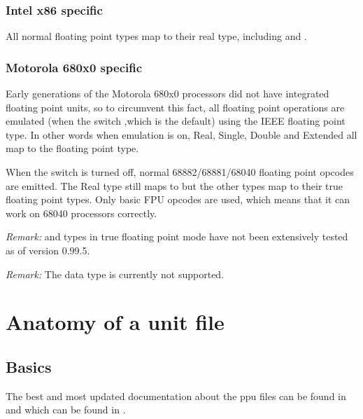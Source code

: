 \documentclass{report}
\begin{document}
\subsection{ Intel x86 specific }

All normal floating point types map to their real type, including
 and .

\subsection{ Motorola 680x0 specific }

Early generations of the Motorola 680x0 processors did not have integrated
floating point units, so to circumvent this fact, all floating point
operations are emulated (when the  switch ,which is the default)
using the IEEE  floating point type. In other words when
emulation is on, Real, Single, Double and Extended all map to the
 floating point type.

When the  switch is turned off, normal 68882/68881/68040
floating point opcodes are emitted. The Real type still maps to
 but the other types map to their true floating point
types. Only basic FPU opcodes are used, which means that it can
work on 68040 processors correctly.

\emph{ Remark: }  and  types in true floating
point mode have not been extensively tested as of version 0.99.5.

\emph{ Remark: } The  data type is currently not supported.

\appendix


\chapter{Anatomy of a unit file}
\label{ch:AppA}

\section{Basics}

The best and most updated documentation about the ppu files can be found
in  and  which can be found in
.
\end{document}
